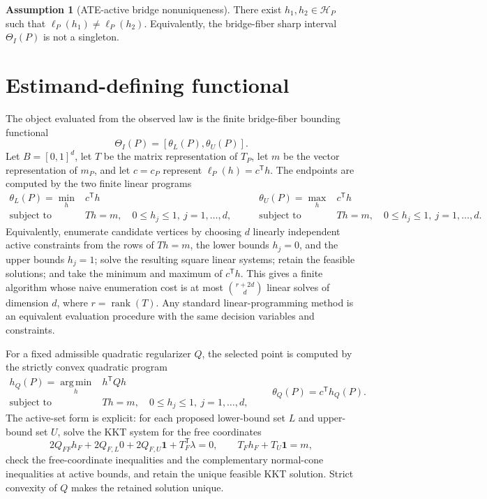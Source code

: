 \documentclass[11pt]{article}
\newcommand{\transpose}{\mathsf{T}}
\newcommand{\calH}{\mathcal{H}}
\theoremstyle{definition}
\newtheorem{assumption}{Assumption}
\theoremstyle{plain}
\theoremstyle{remark}
\begin{document}
\begin{assumption}[ATE-active bridge nonuniqueness]\label{ass:active-nonunique}
There exist \(h_1,h_2\in\calH_P\) such that
\(\ell_P(h_1)\neq\ell_P(h_2)\).  Equivalently, the bridge-fiber sharp
interval \(\Theta_I(P)\) is not a singleton.
\end{assumption}

\section{Estimand-defining functional}
The object evaluated from the observed law is the finite bridge-fiber
bounding functional
\[
  \Theta_I(P)=[\theta_L(P),\theta_U(P)].
\]
Let \(B=[0,1]^d\), let \(T\) be the matrix representation of \(T_P\), let
\(m\) be the vector representation of \(m_P\), and let \(c=c_P\) represent
\(\ell_P(h)=c^\transpose h\).  The endpoints are computed by the two finite
linear programs
\[
\begin{array}{ll}
\theta_L(P)=\min_h & c^\transpose h\\
\text{subject to} & T h=m,\quad 0\le h_j\le 1,\ j=1,\ldots,d,
\end{array}
\qquad
\begin{array}{ll}
\theta_U(P)=\max_h & c^\transpose h\\
\text{subject to} & T h=m,\quad 0\le h_j\le 1,\ j=1,\ldots,d.
\end{array}
\]
Equivalently, enumerate candidate vertices by choosing \(d\) linearly
independent active constraints from the rows of \(T h=m\), the lower bounds
\(h_j=0\), and the upper bounds \(h_j=1\); solve the resulting square linear
systems; retain the feasible solutions; and take the minimum and maximum of
\(c^\transpose h\).  This gives a finite algorithm whose naive enumeration
cost is at most \(\binom{r+2d}{d}\) linear solves of dimension \(d\), where
\(r=\operatorname{rank}(T)\).  Any standard linear-programming method is an
equivalent evaluation procedure with the same decision variables and
constraints.

For a fixed admissible quadratic regularizer \(Q\), the selected point is
computed by the strictly convex quadratic program
\[
\begin{array}{ll}
h_Q(P)=\operatorname*{arg\,min}_h & h^\transpose Qh\\
\text{subject to} & T h=m,\quad 0\le h_j\le 1,\ j=1,\ldots,d,
\end{array}
\qquad
\theta_Q(P)=c^\transpose h_Q(P).
\]
The active-set form is explicit: for each proposed lower-bound set \(L\) and
upper-bound set \(U\), solve the KKT system for the free coordinates
\[
  2Q_{FF}h_F+2Q_{F,L}0+2Q_{F,U}\mathbf 1 + T_F^\transpose\lambda=0,
  \qquad
  T_Fh_F+T_U\mathbf 1=m,
\]
check the free-coordinate inequalities and the complementary normal-cone
inequalities at active bounds, and retain the unique feasible KKT solution.
Strict convexity of \(Q\) makes the retained solution unique.
\end{document}
